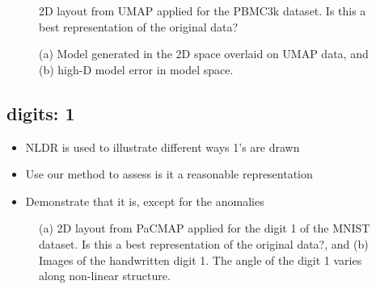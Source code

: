 \documentclass[
  12pt]{article}
\providecommand{\tightlist}{%
  \setlength{\itemsep}{0pt}\setlength{\parskip}{0pt}}\usepackage{longtable,booktabs,array}
\def\tightlist{}
\begin{document}
\begin{figure}[H]


\caption{\label{fig-umapauthor}2D layout from UMAP applied for the
PBMC3k dataset. Is this a best representation of the original data?}

\end{figure}%

\begin{figure}[H]


\caption{\label{fig-model-pbmc-author}(a) Model generated in the 2D
space overlaid on UMAP data, and (b) high-D model error in model space.}

\end{figure}%

\subsection{digits: 1}\label{digits-1}

\begin{itemize}
\tightlist
\item
  NLDR is used to illustrate different ways 1's are drawn
\item
  Use our method to assess is it a reasonable representation
\item
  Demonstrate that it is, except for the anomalies
\end{itemize}

\begin{figure}[H]


\caption{\label{fig-pacmapauthor}(a) 2D layout from PaCMAP applied for
the digit 1 of the MNIST dataset. Is this a best representation of the
original data?, and (b) Images of the handwritten digit 1. The angle of
the digit 1 varies along non-linear structure.}

\end{figure}%
\end{document}
